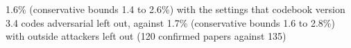 1.6\% (conservative bounds 1.4 to 2.6\%) with the settings that codebook version 3.4 codes adversarial left out, against 1.7\% (conservative bounds 1.6 to 2.8\%) with outside attackers left out (120 confirmed papers against 135)